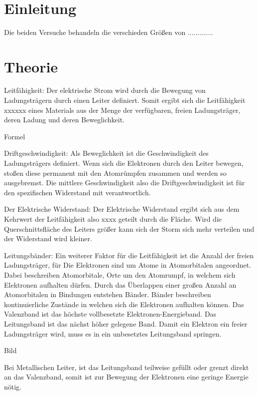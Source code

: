 \documentclass[a4paper]{scrartcl}
\def\header#1#2{
  \begin{center}
    {\Large #1}\\
    {#2}
  \end{center}
}
\numberwithin{equation}{subsection}
\begin{document}
\vspace{10pt}
\header{\HEADDING}{\SUBHEADDING}

\tableofcontents

\newpage

\section{Einleitung}
Die beiden Versuche behandeln die verschieden Größen von .............

\newpage

\section{Theorie}
Leitfähigkeit:
Der elektrische Strom wird durch die Bewegung von Ladungsträgern durch einen Leiter definiert.
Somit ergibt sich die Leitfähigkeit xxxxxx eines Materials aus der Menge der verfügbaren, freien Ladungsträger, deren Ladung und deren Beweglichkeit.

Formel

Driftgeschwindigkeit:
Als Beweglichkeit ist die Geschwindigkeit des Ladungsträgers definiert. Wenn sich die Elektronen durch den Leiter bewegen, stoßen diese permanent mit den Atomrümpfen zusammen und werden so ausgebremst. Die mittlere Geschwindigkeit also die Driftgeschwindigkeit ist für den spezifischen Widerstand mit verantwortlich.

Der  Elektrische Widerstand:
Der Elektrische Widerstand ergibt sich aus dem Kehrwert der Leitfähigkeit also xxxx geteilt durch die Fläche.
Wird die Querschnittsfläche des Leiters größer kann sich der Storm sich mehr verteilen und der Widerstand wird kleiner.

Leitungsbänder:
Ein weiterer Faktor für die Leitfähigkeit ist die Anzahl der freien Ladungsträger, für 
Die Elektronen sind um Atome in Atomorbitalen angeordnet. Dabei beschreiben Atomorbitale, Orte um den Atomrumpf, in welchem sich Elektronen aufhalten dürfen. Durch das Überlappen einer großen Anzahl an Atomorbitalen in Bindungen entstehen Bänder.
Bänder beschreiben kontinuierliche Zustände in welchen sich die Elektronen aufhalten können.
Das Valenzband ist das höchste vollbesetzte Elektronen-Energieband. Das Leitungsband ist das nächst höher gelegene Band.
Damit ein Elektron ein freier Ladungsträger wird, muss es in ein unbesetztes Leitungsband springen. 

Bild

Bei Metallischen Leiter, ist das Leitungsband teilweise gefüllt oder grenzt direkt an das Valenzband, somit ist zur Bewegung der Elektronen eine geringe Energie nötig.
\end{document}
